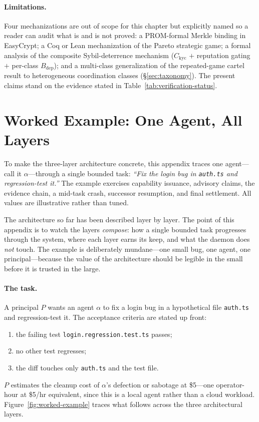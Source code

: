\documentclass[11pt,a4paper]{article}
\theoremstyle{definition}
\theoremstyle{remark}
\begin{document}
\paragraph{Limitations.} Four mechanizations are out of scope for this chapter but explicitly named so a reader can audit what is and is not proved: a PROM-formal Merkle binding in EasyCrypt; a Coq or Lean mechanization of the Pareto strategic game; a formal analysis of the composite Sybil-deterrence mechanism ($C_{\mathrm{kyc}}$ $+$ reputation gating $+$ per-class $B_{\mathrm{dep}}$); and a multi-class generalization of the repeated-game cartel result to heterogeneous coordination classes (\S\ref{sec:taxonomy}). The present claims stand on the evidence stated in Table~\ref{tab:verification-status}.

\section{Worked Example: One Agent, All Layers}\label{app:worked}

To make the three-layer architecture concrete, this appendix traces one agent---call it $\alpha$---through a single bounded task: \emph{``Fix the login bug in \texttt{auth.ts} and regression-test it.''} The example exercises capability issuance, advisory claims, the evidence chain, a mid-task crash, successor resumption, and final settlement. All values are illustrative rather than tuned.

The architecture so far has been described layer by layer. The point of this appendix is to watch the layers \emph{compose}: how a single bounded task progresses through the system, where each layer earns its keep, and what the daemon does \emph{not} touch. The example is deliberately mundane---one small bug, one agent, one principal---because the value of the architecture should be legible in the small before it is trusted in the large.

\paragraph{The task.} A principal $P$ wants an agent $\alpha$ to fix a login bug in a hypothetical file \texttt{auth.ts} and regression-test it. The acceptance criteria are stated up front:
\begin{enumerate}[nosep,leftmargin=*,topsep=2pt]
  \item the failing test \texttt{login.regression.test.ts} passes;
  \item no other test regresses;
  \item the diff touches only \texttt{auth.ts} and the test file.
\end{enumerate}
$P$ estimates the cleanup cost of $\alpha$'s defection or sabotage at \$5---one operator-hour at \$5/hr equivalent, since this is a local agent rather than a cloud workload. Figure~\ref{fig:worked-example} traces what follows across the three architectural layers.
\end{document}
